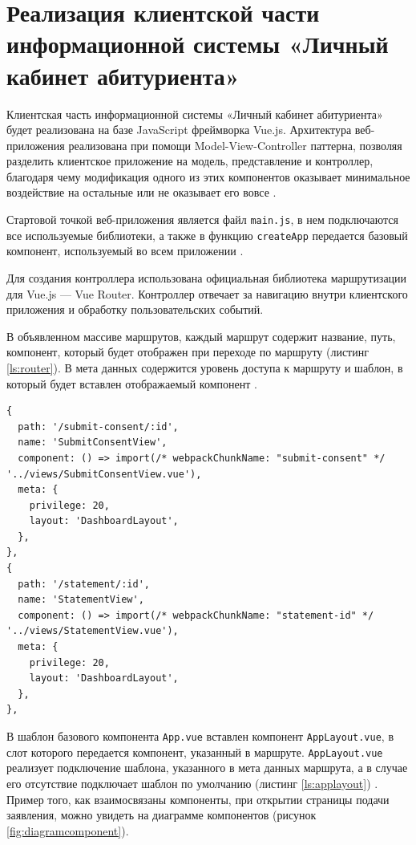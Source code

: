 \chapter{Реализация клиентской части информационной системы «Личный кабинет абитуриента»}

Клиентская часть информационной системы «Личный кабинет абитуриента» будет реализована на базе JavaScript фреймворка Vue.js. Архитектура веб-приложения реализована при помощи Model-View-Controller паттерна, позволяя разделить клиентское приложение на модель, представление и контроллер, благодаря чему модификация одного из этих компонентов оказывает минимальное воздействие на остальные или не оказывает его вовсе \cite{mvcpattern}.

Стартовой точкой веб-приложения является файл \verb|main.js|, в нем подключаются все используемые библиотеки, а также в функцию \verb|createApp| передается базовый компонент, используемый во всем приложении \cite{vuemainjs}.

Для создания контроллера использована официальная библиотека маршрутизации для Vue.js — Vue Router. Контроллер отвечает за навигацию внутри клиентского приложения и обработку пользовательских событий.

В объявленном массиве маршрутов, каждый маршрут содержит название, путь, компонент, который будет отображен при переходе по маршруту (листинг \ref{ls:router}). В мета данных содержится уровень доступа к маршруту и шаблон, в который будет вставлен отображаемый компонент \cite{vuejsrouter}.

\begin{lstlisting}[caption={Примеры объявленных маршрутов}, label={ls:router}]
{
  path: '/submit-consent/:id',
  name: 'SubmitConsentView',
  component: () => import(/* webpackChunkName: "submit-consent" */ '../views/SubmitConsentView.vue'),
  meta: {
    privilege: 20,
    layout: 'DashboardLayout',
  },
},
{
  path: '/statement/:id',
  name: 'StatementView',
  component: () => import(/* webpackChunkName: "statement-id" */ '../views/StatementView.vue'),
  meta: {
    privilege: 20,
    layout: 'DashboardLayout',
  },
},
\end{lstlisting}

В шаблон базового компонента \verb|App.vue| вставлен компонент \verb|AppLayout.vue|, в слот которого передается компонент, указанный в маршруте. \verb|AppLayout.vue| реализует подключение шаблона, указанного в мета данных маршрута, а в случае его отсутствие подключает шаблон по умолчанию (листинг \ref{ls:applayout}) \cite{vuelayout}. Пример того, как взаимосвязаны компоненты, при открытии страницы подачи заявления, можно увидеть на диаграмме компонентов (рисунок \ref{fig:diagramcomponent}).

